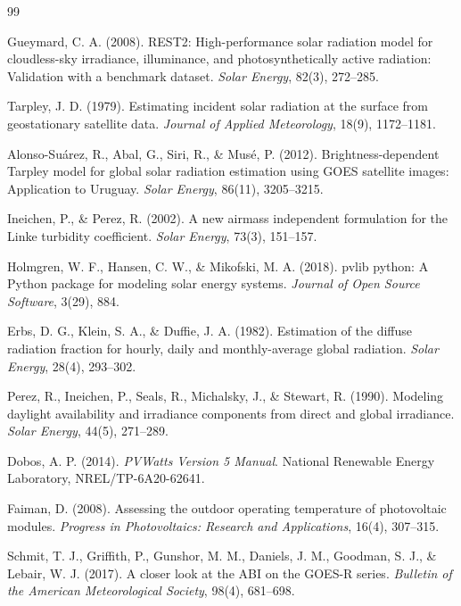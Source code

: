 \documentclass[11pt,a4paper]{article}
\begin{document}
\begin{thebibliography}{99}

Gueymard, C. A. (2008).
REST2: High-performance solar radiation model for cloudless-sky irradiance, illuminance, and photosynthetically active radiation: Validation with a benchmark dataset.
\textit{Solar Energy}, 82(3), 272--285.

Tarpley, J. D. (1979).
Estimating incident solar radiation at the surface from geostationary satellite data.
\textit{Journal of Applied Meteorology}, 18(9), 1172--1181.

Alonso-Suárez, R., Abal, G., Siri, R., \& Musé, P. (2012).
Brightness-dependent Tarpley model for global solar radiation estimation using GOES satellite images: Application to Uruguay.
\textit{Solar Energy}, 86(11), 3205--3215.

Ineichen, P., \& Perez, R. (2002).
A new airmass independent formulation for the Linke turbidity coefficient.
\textit{Solar Energy}, 73(3), 151--157.

Holmgren, W. F., Hansen, C. W., \& Mikofski, M. A. (2018).
pvlib python: A Python package for modeling solar energy systems.
\textit{Journal of Open Source Software}, 3(29), 884.

Erbs, D. G., Klein, S. A., \& Duffie, J. A. (1982).
Estimation of the diffuse radiation fraction for hourly, daily and monthly-average global radiation.
\textit{Solar Energy}, 28(4), 293--302.

Perez, R., Ineichen, P., Seals, R., Michalsky, J., \& Stewart, R. (1990).
Modeling daylight availability and irradiance components from direct and global irradiance.
\textit{Solar Energy}, 44(5), 271--289.

Dobos, A. P. (2014).
\textit{PVWatts Version 5 Manual}.
National Renewable Energy Laboratory, NREL/TP-6A20-62641.

Faiman, D. (2008).
Assessing the outdoor operating temperature of photovoltaic modules.
\textit{Progress in Photovoltaics: Research and Applications}, 16(4), 307--315.

Schmit, T. J., Griffith, P., Gunshor, M. M., Daniels, J. M., Goodman, S. J., \& Lebair, W. J. (2017).
A closer look at the ABI on the GOES-R series.
\textit{Bulletin of the American Meteorological Society}, 98(4), 681--698.

\end{thebibliography}
\end{document}
